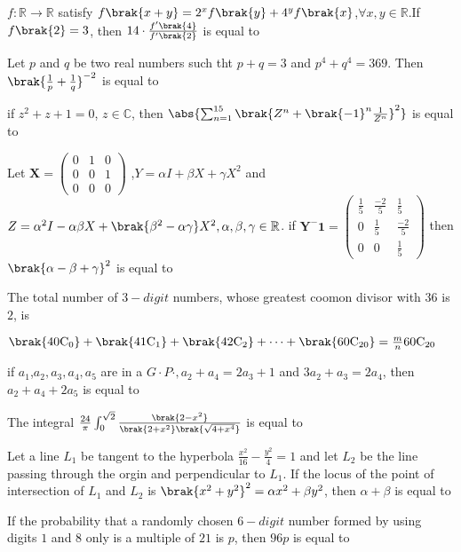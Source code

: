 \iffalse
\title{Assignment 3}
\author{AI24BTECH11018}
\section{integer}
\fi

\item $f: \mathbb{R} \to \mathbb{R}$ satisfy $f\brak{x+y}=2^xf\brak{y}+4^yf\brak{x}$,$\forall x,  y \in \mathbb{R}$.If $f\brak{2}=3$, then $14 \cdot \frac{f^{\prime}\brak{4}}{f^{\prime}\brak{2}}$ is equal to 
\hfill{}
    \item Let $p$ and $q$ be two real numbers such tht $p+q=3$
and $p^4+q^4=369$. Then $\brak{\frac{1}{p}+\frac{1}{q}}^{-2}$ is equal to 
\hfill{}
\item if $z^2+z+1=0$, $z \in \mathbb{C}$, then $\abs{\sum_{n=1}^{15}\brak{Z^n+{\brak{-1}^n\frac{1}{Z^n}}}^2}$ is equal to
\hfill{}
\item Let $\mathbf{X} = \begin{pmatrix}
0 & 1 & 0 \\
0 & 0 & 1 \\
0 & 0 & 0
\end{pmatrix}$ ,$Y=\alpha I+\beta X+\gamma X^2$ and $Z={\alpha^2}I-\alpha \beta X+\brak{{\beta^2}-\alpha \gamma}X^2,\alpha ,\beta ,\gamma \in \mathbb{R}$. if $\mathbf{Y^-1} = \begin{pmatrix}
\frac{1}{5} & \frac{-2}{5} & \frac{1}{5} \\
0 & \frac{1}{5} & \frac{-2}{5} \\
0 & 0 & \frac{1}{5}
\end{pmatrix}$ then $\brak{\alpha -\beta +\gamma}^2$ is equal to
\hfill{}
\item The total number of $3-digit$ numbers, whose greatest coomon divisor with $36$ is $2$, is
\hfill{}
\item $\brak{\mathrm{40C_0}}+\brak{\mathrm{41C_1}}+\brak{\mathrm{42C_2}}+\cdots +\brak{\mathrm{60C_{20}}}=\frac{m}{n}\mathrm{60C_{20}}$
\hfill{}
\item if $a_1$,$a_2,a_3,a_4,a_5$ are in a $G\cdot P\cdot ,a_2+a_4=2a_3+1$ and $3a_2+a_3=2a_4$, then $a_2+a_4+2a_5$ is equal to
\hfill{}
\item The integral $\frac{24}{\pi}\int_{0}^{\sqrt{2}}\frac{\brak{2-x^2}}{\brak{2+x^2}\brak{\sqrt{4+x^4}}}$ is equal to 
\hfill{}
\item Let a line $L_1$ be tangent to the hyperbola $\frac{x^2}{16}-\frac{y^2}{4}=1$ and let $L_2$ be the line passing through the orgin and perpendicular to $L_1$. If the locus of the point of intersection of $L_1$ and $L_2$ is $\brak{x^2+y^2}^2=\alpha x^2+\beta y^2$, then $\alpha + \beta $ is equal to 
\hfill{}
\item If the probability that a randomly chosen $6-digit$ number formed by using digits $1$ and $8$ only is a multiple of $21$ is $p$, then $96 p$ is equal to 
\hfill{}

%
